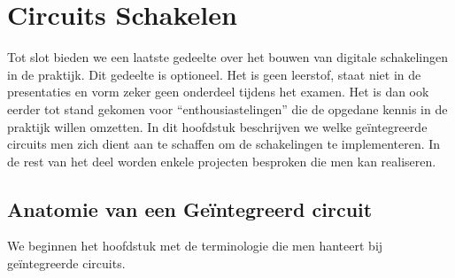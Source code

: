 \chapter{Circuits Schakelen}
\begin{chapterintro}
Tot slot bieden we een laatste gedeelte over het bouwen van digitale schakelingen in de praktijk. Dit gedeelte is optioneel. Het is geen leerstof, staat niet in de presentaties en vorm zeker geen onderdeel tijdens het examen. Het is dan ook eerder tot stand gekomen voor ``enthousiastelingen'' die de opgedane kennis in de praktijk willen omzetten. In dit hoofdstuk beschrijven we welke ge\"integreerde circuits men zich dient aan te schaffen om de schakelingen te implementeren. In de rest van het deel worden enkele projecten besproken die men kan realiseren.
\end{chapterintro}
\section{Anatomie van een Ge\"integreerd circuit}
We beginnen het hoofdstuk met de terminologie die men hanteert bij ge\"integreerde circuits.

